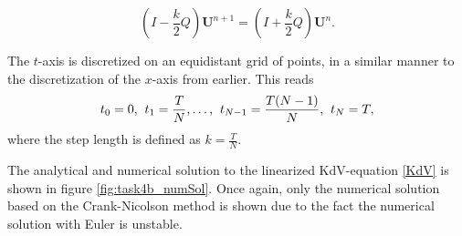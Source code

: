 \begin{equation*}
    (I - \frac{k}{2}Q) \boldsymbol{U}^{n+1} = (I+\frac{k}{2}Q) \boldsymbol{U}^{n}.
\end{equation*}

The $t$-axis is discretized on an equidistant grid of points, in a similar manner to the discretization of the $x$-axis from earlier. This reads
\begin{equation*}
    t_0 = 0 \text{,} \hspace{2mm} t_1 = \frac{T}{N} \text{,} \dots \text{,} \hspace{2mm} t_{N-1} = \frac{T(N-1)}{N} \text{,} \hspace{2mm} t_{N} =T, 
\end{equation*}
where the step length is defined as $k=\frac{T}{N}$.

The analytical and numerical solution to the linearized KdV-equation \eqref{KdV} is shown in figure \ref{fig:task4b_numSol}. Once again, only the numerical solution based on the Crank-Nicolson method is shown due to the fact the numerical solution with Euler is unstable.

